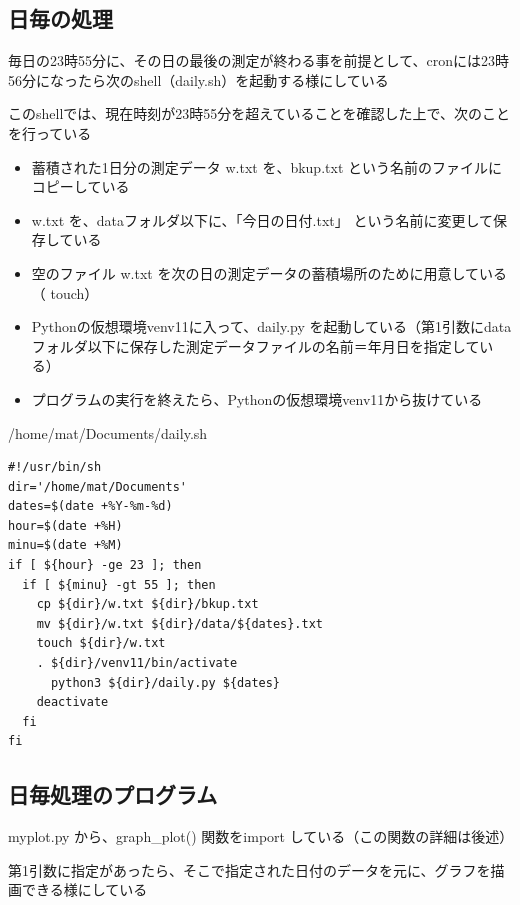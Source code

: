 \documentclass[12pt,a4j]{jsbook}
\begin{document}
\subsection{日毎の処理}

毎日の23時55分に、その日の最後の測定が終わる事を前提として、cronには23時56分になったら次のshell（daily.sh）を起動する様にしている

このshellでは、現在時刻が23時55分を超えていることを確認した上で、次のことを行っている
\begin{itemize}
	\item 蓄積された1日分の測定データ w.txt を、bkup.txt という名前のファイルにコピーしている
	\item w.txt を、dataフォルダ以下に、「今日の日付.txt」 という名前に変更して保存している
	\item 空のファイル w.txt を次の日の測定データの蓄積場所のために用意している（ touch）
	\item Pythonの仮想環境venv11に入って、daily.py を起動している（第1引数にdataフォルダ以下に保存した測定データファイルの名前＝年月日を指定している）
	\item プログラムの実行を終えたら、Pythonの仮想環境venv11から抜けている
\end{itemize}

\begin{spacing}{0.95}
\begin{itembox}[l]{/home/mat/Documents/daily.sh}
\begin{verbatim}
#!/usr/bin/sh
dir='/home/mat/Documents'
dates=$(date +%Y-%m-%d)
hour=$(date +%H)
minu=$(date +%M)
if [ ${hour} -ge 23 ]; then
  if [ ${minu} -gt 55 ]; then
    cp ${dir}/w.txt ${dir}/bkup.txt
    mv ${dir}/w.txt ${dir}/data/${dates}.txt
    touch ${dir}/w.txt
    . ${dir}/venv11/bin/activate
      python3 ${dir}/daily.py ${dates}
    deactivate
  fi
fi
\end{verbatim}
\end{itembox}
\end{spacing}


\subsection{日毎処理のプログラム}

	myplot.py から、graph\_plot() 関数をimport している（この関数の詳細は後述）

	第1引数に指定があったら、そこで指定された日付のデータを元に、グラフを描画できる様にしている
\end{document}
